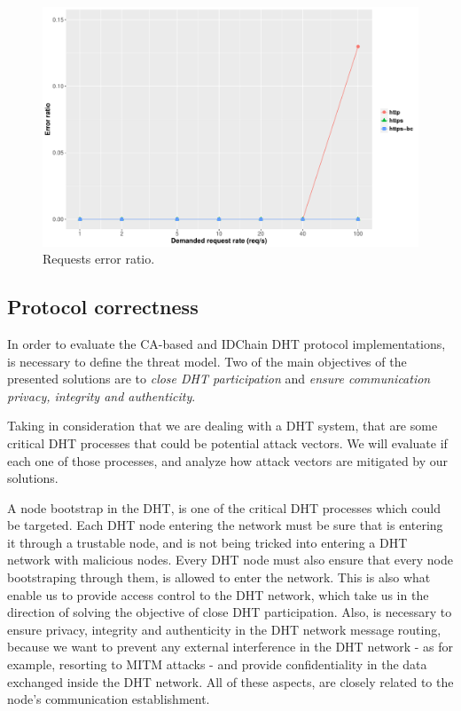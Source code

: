 \begin{figure}[htb]
  \centering
  \includegraphics[scale=0.4]{Figures/evaluation/error-ratio-reads-new.pdf}
  \caption{Requests error ratio.}
  \label{fig:error-ratio-reads}
\end{figure}

\subsection{Protocol correctness}
\label{section:protocol-correcteness}

In order to evaluate the CA-based and IDChain DHT protocol implementations, is necessary to define the threat model.
Two of the main objectives of the presented solutions are to \textit{close DHT participation} and \textit{ensure communication privacy, integrity and authenticity}.

Taking in consideration that we are dealing with a DHT system, that are some critical DHT processes that could be potential attack vectors.
We will evaluate if each one of those processes, and analyze how attack vectors are mitigated by our solutions.

A node bootstrap in the DHT, is one of the critical DHT processes which could be targeted.
Each DHT node entering the network must be sure that is entering it through a trustable node, and is not being tricked into entering a DHT network with malicious nodes.
Every DHT node must also ensure that every node bootstraping through them, is allowed to enter the network.
This is also what enable us to provide access control to the DHT network, which take us in the direction of solving the objective of close DHT participation.
Also, is necessary to ensure privacy, integrity and authenticity in the DHT network message routing, because we want to prevent any external interference in the DHT network - as for example, resorting to MITM attacks - and provide confidentiality in the data exchanged inside the DHT network.
All of these aspects, are closely related to the node's communication establishment.

